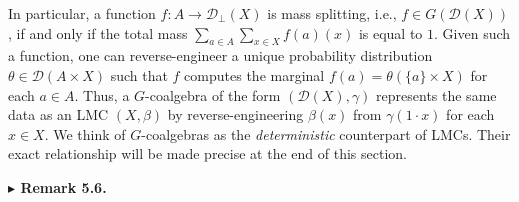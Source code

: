 \documentclass[11pt,a4paper]{amsart}
\begin{document}
\hypertarget{html:S5.SS0.SSS0.Px1.p4}{} In particular, a function %
\hypertarget{html:S5.SS0.SSS0.Px1.p4.m1}{}\({f\colon A\to{\mathcal{D}}_{\bot}(X)}\) is mass splitting, i.e., %
\hypertarget{html:S5.SS0.SSS0.Px1.p4.m2}{}\({f\in G({\mathcal{D}}(X))}\), if and only if the total mass %
\hypertarget{html:S5.SS0.SSS0.Px1.p4.m3}{}\({\sum_{a\in A}\sum_{x\in X}f(a)(x)}\) is equal to %
\hypertarget{html:S5.SS0.SSS0.Px1.p4.m4}{}\({1}\). Given such a function, one can reverse-engineer a unique probability distribution %
\hypertarget{html:S5.SS0.SSS0.Px1.p4.m5}{}\({\theta\in{\mathcal{D}}(A\times X)}\) such that %
\hypertarget{html:S5.SS0.SSS0.Px1.p4.m6}{}\({f}\) computes the marginal %
\hypertarget{html:S5.SS0.SSS0.Px1.p4.m7}{}\({f(a)=\theta(\{a\}\times X)}\) for each %
\hypertarget{html:S5.SS0.SSS0.Px1.p4.m8}{}\({a\in A}\). Thus, a %
\hypertarget{html:S5.SS0.SSS0.Px1.p4.m9}{}\({G}\)-coalgebra of the form %
\hypertarget{html:S5.SS0.SSS0.Px1.p4.m10}{}\({({\mathcal{D}}(X),\gamma)}\) represents the same data as an LMC %
\hypertarget{html:S5.SS0.SSS0.Px1.p4.m11}{}\({(X,\beta)}\) by reverse-engineering %
\hypertarget{html:S5.SS0.SSS0.Px1.p4.m12}{}\({\beta(x)}\) from %
\hypertarget{html:S5.SS0.SSS0.Px1.p4.m13}{}\({\gamma(1\cdot x)}\) for each %
\hypertarget{html:S5.SS0.SSS0.Px1.p4.m14}{}\({x\in X}\). We think of %
\hypertarget{html:S5.SS0.SSS0.Px1.p4.m15}{}\({G}\)-coalgebras as the \emph{deterministic} counterpart of LMCs. Their exact relationship will be made precise at the end of this section.
\par\medskip
\hypertarget{html:S5.Thmtheorem6}{} \par\noindent\textbf{%
\hypertarget{html:S5.Thmtheorem6.m1}{}\({\blacktriangleright}\) Remark 5.6.}\quad  %
\end{document}

